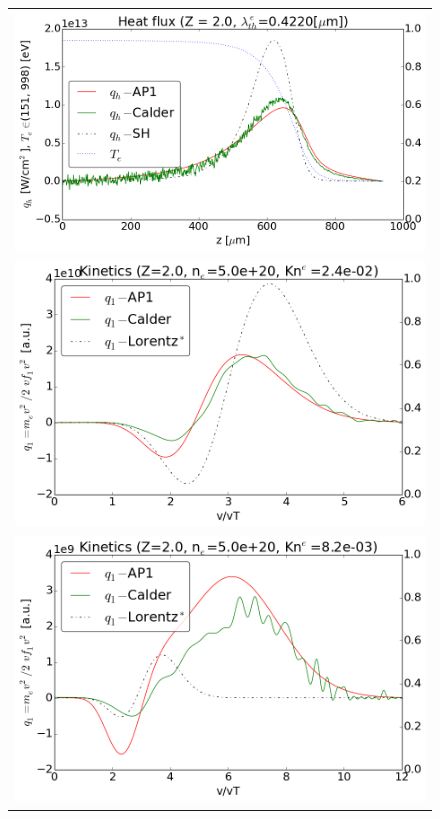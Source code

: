 \begin{figure}[tbh]
  \begin{center}
    \begin{tabular}{c}
      \includegraphics[width=\figscale\textwidth]{../VFPdata/C7_Calder_case1_heatflux.png} 
	  \\ 
	  \includegraphics[width=\figscale\textwidth]{../VFPdata/C7_Calder_case1_kinetics.png}
	  \\ 
	  \includegraphics[width=\figscale\textwidth]{../VFPdata/C7_Calder_case1_nonlocal_kinetics.png}

\end{tabular}
\end{center}
\end{figure}
